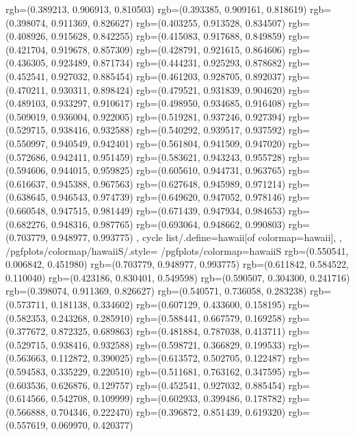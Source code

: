 {{{					rgb=(0.389213, 0.906913, 0.810503)
					rgb=(0.393385, 0.909161, 0.818619)
					rgb=(0.398074, 0.911369, 0.826627)
					rgb=(0.403255, 0.913528, 0.834507)
					rgb=(0.408926, 0.915628, 0.842255)
					rgb=(0.415083, 0.917688, 0.849859)
					rgb=(0.421704, 0.919678, 0.857309)
					rgb=(0.428791, 0.921615, 0.864606)
					rgb=(0.436305, 0.923489, 0.871734)
					rgb=(0.444231, 0.925293, 0.878682)
					rgb=(0.452541, 0.927032, 0.885454)
					rgb=(0.461203, 0.928705, 0.892037)
					rgb=(0.470211, 0.930311, 0.898424)
					rgb=(0.479521, 0.931839, 0.904620)
					rgb=(0.489103, 0.933297, 0.910617)
					rgb=(0.498950, 0.934685, 0.916408)
					rgb=(0.509019, 0.936004, 0.922005)
					rgb=(0.519281, 0.937246, 0.927394)
					rgb=(0.529715, 0.938416, 0.932588)
					rgb=(0.540292, 0.939517, 0.937592)
					rgb=(0.550997, 0.940549, 0.942401)
					rgb=(0.561804, 0.941509, 0.947020)
					rgb=(0.572686, 0.942411, 0.951459)
					rgb=(0.583621, 0.943243, 0.955728)
					rgb=(0.594606, 0.944015, 0.959825)
					rgb=(0.605610, 0.944731, 0.963765)
					rgb=(0.616637, 0.945388, 0.967563)
					rgb=(0.627648, 0.945989, 0.971214)
					rgb=(0.638645, 0.946543, 0.974739)
					rgb=(0.649620, 0.947052, 0.978146)
					rgb=(0.660548, 0.947515, 0.981449)
					rgb=(0.671439, 0.947934, 0.984653)
					rgb=(0.682276, 0.948316, 0.987765)
					rgb=(0.693064, 0.948662, 0.990803)
					rgb=(0.703779, 0.948977, 0.993775)
			},
		cycle list/.define={hawaii}{[of colormap=hawaii]},
		},
		/pgfplots/colormap/hawaiiS/.style={
			/pgfplots/colormap={hawaiiS}{%
					rgb=(0.550541, 0.006842, 0.451980)
					rgb=(0.703779, 0.948977, 0.993775)
					rgb=(0.611842, 0.584522, 0.110040)
					rgb=(0.423186, 0.830401, 0.549598)
					rgb=(0.590507, 0.304300, 0.241716)
					rgb=(0.398074, 0.911369, 0.826627)
					rgb=(0.540571, 0.736058, 0.283238)
					rgb=(0.573711, 0.181138, 0.334602)
					rgb=(0.607129, 0.433600, 0.158195)
					rgb=(0.582353, 0.243268, 0.285910)
					rgb=(0.588441, 0.667579, 0.169258)
					rgb=(0.377672, 0.872325, 0.689863)
					rgb=(0.481884, 0.787038, 0.413711)
					rgb=(0.529715, 0.938416, 0.932588)
					rgb=(0.598721, 0.366829, 0.199533)
					rgb=(0.563663, 0.112872, 0.390025)
					rgb=(0.613572, 0.502705, 0.122487)
					rgb=(0.594583, 0.335229, 0.220510)
					rgb=(0.511681, 0.763162, 0.347595)
					rgb=(0.603536, 0.626876, 0.129757)
					rgb=(0.452541, 0.927032, 0.885454)
					rgb=(0.614566, 0.542708, 0.109999)
					rgb=(0.602933, 0.399486, 0.178782)
					rgb=(0.566888, 0.704346, 0.222470)
					rgb=(0.396872, 0.851439, 0.619320)
					rgb=(0.557619, 0.069970, 0.420377)
}}}
